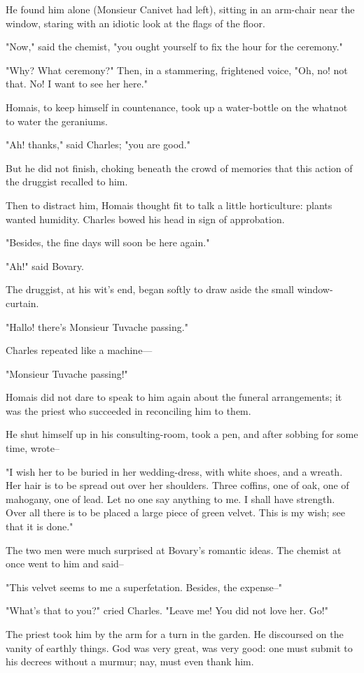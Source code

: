 \documentclass[11pt,twocolumn]{ltugboat}
\begin{document}
He found him alone (Monsieur Canivet had left), sitting in an arm-chair
near the window, staring with an idiotic look at the flags of the floor.

"Now," said the chemist, "you ought yourself to fix the hour for the
ceremony."

"Why? What ceremony?" Then, in a stammering, frightened voice, "Oh, no!
not that. No! I want to see her here."

Homais, to keep himself in countenance, took up a water-bottle on the
whatnot to water the geraniums.

"Ah! thanks," said Charles; "you are good."

But he did not finish, choking beneath the crowd of memories that this
action of the druggist recalled to him.

Then to distract him, Homais thought fit to talk a little horticulture:
plants wanted humidity. Charles bowed his head in sign of approbation.

"Besides, the fine days will soon be here again."

"Ah!" said Bovary.

The druggist, at his wit's end, began softly to draw aside the small
window-curtain.

"Hallo! there's Monsieur Tuvache passing."

Charles repeated like a machine---

"Monsieur Tuvache passing!"

Homais did not dare to speak to him again about the funeral
arrangements; it was the priest who succeeded in reconciling him to
them.

He shut himself up in his consulting-room, took a pen, and after sobbing
for some time, wrote--

"I wish her to be buried in her wedding-dress, with white shoes, and a
wreath. Her hair is to be spread out over her shoulders. Three coffins,
one of oak, one of mahogany, one of lead. Let no one say anything to me.
I shall have strength. Over all there is to be placed a large piece of
green velvet. This is my wish; see that it is done."

The two men were much surprised at Bovary's romantic ideas. The chemist
at once went to him and said--

"This velvet seems to me a superfetation. Besides, the expense--"

"What's that to you?" cried Charles. "Leave me! You did not love her.
Go!"

The priest took him by the arm for a turn in the garden. He discoursed
on the vanity of earthly things. God was very great, was very good: one
must submit to his decrees without a murmur; nay, must even thank him.
\end{document}
